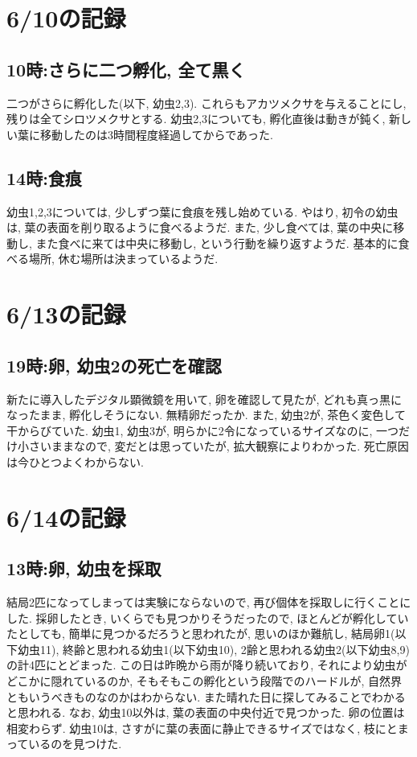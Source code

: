 \documentclass{jsarticle}
\begin{document}
\section{6/10の記録}
\subsection{10時:さらに二つ孵化, 全て黒く}
二つがさらに孵化した(以下, 幼虫2,3). これらもアカツメクサを与えることにし, 残りは全てシロツメクサとする. 
幼虫2,3についても, 孵化直後は動きが鈍く, 新しい葉に移動したのは3時間程度経過してからであった. 

\subsection{14時:食痕}
幼虫1,2,3については, 少しずつ葉に食痕を残し始めている. やはり, 初令の幼虫は, 葉の表面を削り取るように食べるようだ. 
また, 少し食べては, 葉の中央に移動し, また食べに来ては中央に移動し, という行動を繰り返すようだ. 
基本的に食べる場所, 休む場所は決まっているようだ. 

\section{6/13の記録}
\subsection{19時:卵, 幼虫2の死亡を確認}
新たに導入したデジタル顕微鏡を用いて, 卵を確認して見たが, どれも真っ黒になったまま, 孵化しそうにない. 
無精卵だったか. 
また, 幼虫2が, 茶色く変色して干からびていた. 幼虫1, 幼虫3が, 明らかに2令になっているサイズなのに, 一つだけ小さいままなので, 変だとは思っていたが, 拡大観察によりわかった. 
死亡原因は今ひとつよくわからない. 

\section{6/14の記録}
\subsection{13時:卵, 幼虫を採取}
結局2匹になってしまっては実験にならないので, 再び個体を採取しに行くことにした. 
採卵したとき, いくらでも見つかりそうだったので, ほとんどが孵化していたとしても, 簡単に見つかるだろうと思われたが, 
思いのほか難航し, 結局卵1(以下幼虫11), 終齢と思われる幼虫1(以下幼虫10), 2齢と思われる幼虫2(以下幼虫8,9)の計4匹にとどまった. 
この日は昨晩から雨が降り続いており, それにより幼虫がどこかに隠れているのか, そもそもこの孵化という段階でのハードルが, 自然界ともいうべきものなのかはわからない. 
また晴れた日に探してみることでわかると思われる. 
なお, 幼虫10以外は, 葉の表面の中央付近で見つかった. 卵の位置は相変わらず. 幼虫10は, さすがに葉の表面に静止できるサイズではなく, 枝にとまっているのを見つけた. 
\end{document}
